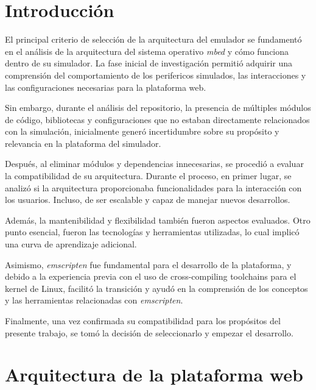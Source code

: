 \section{Introducción}
El principal criterio de selección de la arquitectura del emulador se fundamentó en el análisis de la arquitectura del sistema operativo \textit{mbed} y cómo funciona dentro de su simulador. La fase inicial de investigación permitió adquirir una comprensión del comportamiento de los perifericos simulados, las interacciones y las configuraciones necesarias para la plataforma web. 

Sin embargo, durante el análisis del repositorio, la presencia de múltiples módulos de código, bibliotecas y configuraciones que no estaban directamente relacionados con la simulación, inicialmente generó incertidumbre sobre su propósito y relevancia en la plataforma del simulador.
 
Después, al eliminar módulos y dependencias innecesarias, se procedió a evaluar la compatibilidad de su arquitectura. Durante el proceso, en primer lugar, se analizó si la arquitectura proporcionaba funcionalidades para la interacción con los usuarios. Incluso, de ser escalable y capaz de manejar nuevos desarrollos. 

Además, la mantenibilidad y flexibilidad también fueron aspectos evaluados. Otro punto esencial, fueron las tecnologías y herramientas utilizadas, lo cual implicó una curva de aprendizaje adicional. 

Asimismo, \textit{emscripten} fue fundamental para el desarrollo de la plataforma, y debido a la experiencia previa con el uso de cross-compiling toolchains para el kernel de Linux, facilitó la transición y ayudó en la comprensión de los conceptos y las herramientas relacionadas con \textit{emscripten}.

Finalmente, una vez confirmada su compatibilidad para los propósitos del presente trabajo, se tomó la decisión de seleccionarlo y empezar el desarrollo.
\hfill \break
\hfill \break
\hfill \break
\hfill \break

\section{Arquitectura de la plataforma web}




